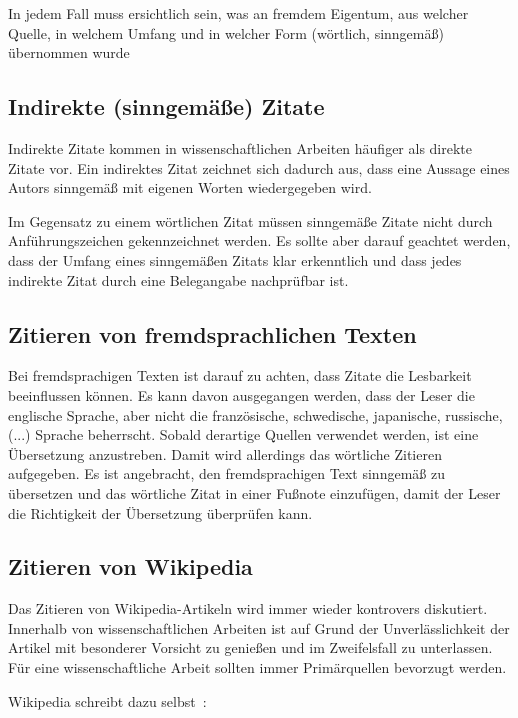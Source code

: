 In jedem Fall muss ersichtlich sein, was an fremdem Eigentum, aus welcher Quelle, in welchem Umfang und in welcher Form (wörtlich, sinngemäß) übernommen wurde

\subsection{Indirekte (sinngemäße) Zitate}\label{ssec:indirekte-sinngemasse-zitate}
%
Indirekte Zitate kommen in wissenschaftlichen Arbeiten häufiger als direkte Zitate vor. Ein indirektes Zitat zeichnet sich dadurch aus, dass eine Aussage eines Autors sinngemäß mit eigenen Worten wiedergegeben wird.

Im Gegensatz zu einem wörtlichen Zitat müssen sinngemäße Zitate nicht durch Anführungszeichen gekennzeichnet werden. Es sollte aber darauf geachtet werden, dass der Umfang eines sinngemäßen Zitats klar erkenntlich und dass jedes indirekte Zitat durch eine Belegangabe nachprüfbar ist.

\subsection{Zitieren von fremdsprachlichen Texten}\label{ssec:zitieren-von-fremdsprachlichen-texten}
%
Bei fremdsprachigen Texten ist darauf zu achten, dass Zitate die Lesbarkeit beeinflussen können. Es kann davon ausgegangen werden, dass der Leser die englische Sprache, aber nicht die französische, schwedische, japanische, russische, (...) Sprache beherrscht. Sobald derartige Quellen verwendet werden, ist eine Übersetzung anzustreben. Damit wird allerdings das wörtliche Zitieren aufgegeben. Es ist angebracht, den fremdsprachigen Text sinngemäß zu übersetzen und das wörtliche Zitat in einer Fußnote einzufügen, damit der Leser die Richtigkeit der Übersetzung überprüfen kann.

\subsection{Zitieren von Wikipedia}\label{ssec:zitieren-von-wikipedia}
%
Das Zitieren von Wikipedia-Artikeln wird immer wieder kontrovers diskutiert. Innerhalb von wissenschaftlichen Arbeiten ist auf Grund der Unverlässlichkeit der Artikel mit besonderer Vorsicht zu genießen und im Zweifelsfall zu unterlassen. Für eine wissenschaftliche Arbeit sollten immer Primärquellen bevorzugt werden.

Wikipedia schreibt dazu selbst~\cite{wikipedia:citing}:

